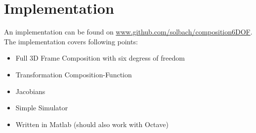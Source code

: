 \documentclass[10pt,a4paper]{scrartcl}
\begin{document}
\section{Implementation}
An implementation can be found on \href{https://github.com/solbach/composition6DOF}{www.github.com/solbach/composition6DOF}. \\The implementation covers following points:
\begin{itemize}
\item Full 3D Frame Composition with six degress of freedom
\item Transformation Composition-Function
\item Jacobians
\item Simple Simulator
\item Written in Matlab (should also work with Octave)
\end{itemize}

\end{document}
